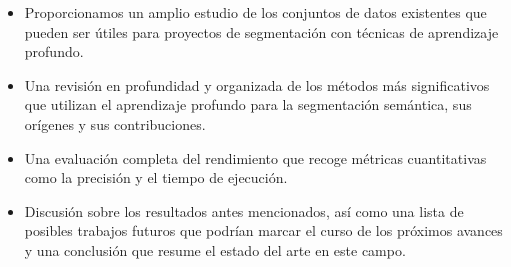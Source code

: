 \begin{itemize}
	\item Proporcionamos un amplio estudio de los conjuntos de datos existentes que pueden ser útiles para proyectos de segmentación con técnicas de aprendizaje profundo.
	\item Una revisión en profundidad y organizada de los métodos más significativos que utilizan el aprendizaje profundo para la segmentación semántica, sus orígenes y sus contribuciones.
	\item Una evaluación completa del rendimiento que recoge métricas cuantitativas como la precisión y el tiempo de ejecución.
	\item Discusión sobre los resultados antes mencionados, así como una lista de posibles trabajos futuros que podrían marcar el curso de los próximos avances y una conclusión que resume el estado del arte en este campo.
\end{itemize}
